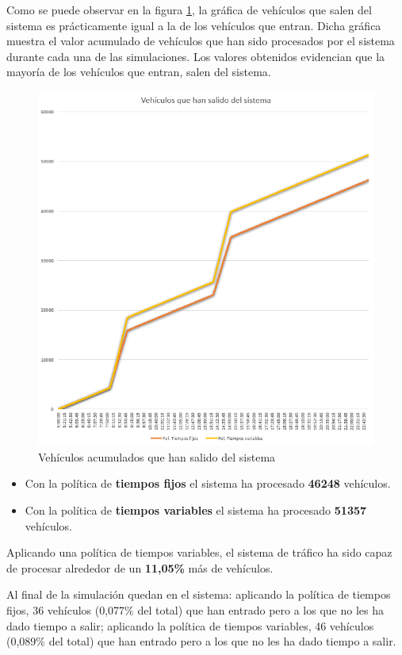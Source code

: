 Como se puede observar en la figura \ref{fig:vehicles_out_city2}, la gráfica de vehículos que salen del sistema es prácticamente igual a la de los vehículos que entran. Dicha gráfica muestra el valor acumulado de vehículos que han sido procesados por el sistema durante cada una de las simulaciones. Los valores obtenidos evidencian que la mayoría de los vehículos que entran, salen del sistema.
\begin{figure}[H]
    \centering
    \includegraphics[width=0.80\linewidth]{text/image/SIMvehiclesOutCITY2-CONFIG2.png}
    \caption{Vehículos acumulados que han salido del sistema}
    \label{fig:vehicles_out_city2}
\end{figure}
\begin{itemize}
    \item Con la política de \textbf{tiempos fijos} el sistema ha procesado \textbf{46248} vehículos.
    \item Con la política de \textbf{tiempos variables} el sistema ha procesado \textbf{51357} vehículos.
\end{itemize}
Aplicando una política de tiempos variables, el sistema de tráfico ha sido capaz de procesar alrededor de un \textbf{11,05\%} más de vehículos.

Al final de la simulación quedan en el sistema: aplicando la política de tiempos fijos, 36 vehículos (0,077\% del total) que han entrado pero a los que no les ha dado tiempo a salir; aplicando la política de tiempos variables, 46 vehículos (0,089\% del total) que han entrado pero a los que no les ha dado tiempo a salir.

